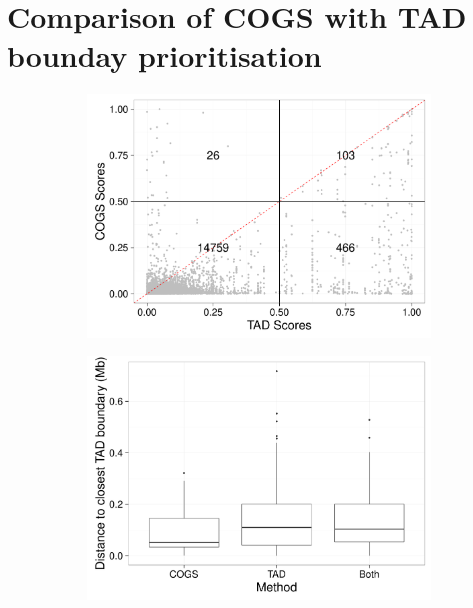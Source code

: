\documentclass[a4paper,11pt]{report}
\begin{document}
\section{Comparison of COGS with TAD bounday prioritisation}
\begin{figure}[h]
\centering
	 \begin{subfigure}{\textwidth}
		\includegraphics[width=\linewidth]{dot.pdf}
		\caption{}\label{fig:fig_a}
	\end{subfigure}
	\hspace{1cm}
	\begin{subfigure}{0.7\textwidth}
		\includegraphics[width=\linewidth]{dist_boxplot.pdf}
		\caption{}\label{fig:fig_b}
	\end{subfigure}
\begin{minipage}[t]{0.7\textwidth}

\end{minipage}
\end{figure}
\end{document}
